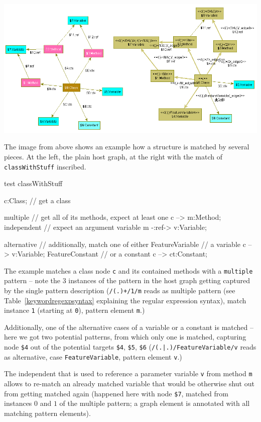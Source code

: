 \begin{example}

\begin{center}
  \parbox{0.99\linewidth}{\includegraphics[width=\linewidth]{fig/exnested}}
\end{center}

The image from above shows an example how a structure is matched by several pieces.
At the left, the plain host graph, at the right with the match of \texttt{classWithStuff} inscribed.

\begin{grgen}
test classWithStuff
{
  c:Class; // get a class
	
  multiple { // get all of its methods, expect at least one
    c --> m:Method;
		independent { // expect an argument variable
		  m -:ref-> v:Variable;
		}
  }	

  alternative // additionally, match one of either
  {
    FeatureVariable { // a variable
      c --> v:Variable;
    }
    FeatureConstant { // or a constant
      c --> ct:Constant;
    }
  }
}
\end{grgen}

The example matches a class node \texttt{c} and its contained methods with a \texttt{multiple} pattern -- note the 3 instances of the pattern in the host graph getting captured by the single pattern description
(\verb#/(.)+/1/m# reads as multiple pattern (see Table~\ref{keywordregexpsyntax} explaining the regular expression syntax), match instance \texttt{1} (starting at \texttt{0}), pattern element \texttt{m}.)

Additionally, one of the alternative cases of a variable or a constant is matched -- here we got two potential patterns, from which only one is matched, capturing node \verb#$4# out of the potential targets \verb#$4#, \verb#$5#, \verb#$6#
(\verb#/(.|.)/FeatureVariable/v# reads as alternative, case \texttt{FeatureVariable}, pattern element \texttt{v}.)

The independent that is used to reference a parameter variable \texttt{v} from method \texttt{m} allows to re-match an already matched variable that would be otherwise shut out from getting matched again
(happened here with node \verb#$7#, matched from instances $0$ and $1$ of the multiple pattern; a graph element is annotated with all matching pattern elements).

\end{example}



